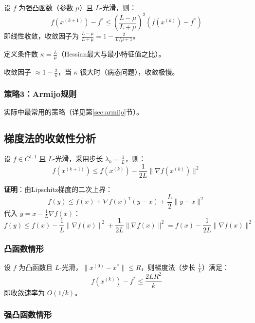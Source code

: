 \begin{theorem}[精确线搜索的收敛率]
设 $f$ 为强凸函数（参数 $\mu$）且 $L$-光滑，则：
\[
f(x^{(k+1)}) - f^* \leq \left(\frac{L - \mu}{L + \mu}\right)^2 (f(x^{(k)}) - f^*)
\]
即线性收敛，收敛因子为 $\frac{L-\mu}{L+\mu} = 1 - \frac{2}{L/\mu + 1}$。
\end{theorem}

\begin{notebox}[条件数的影响]
定义条件数 $\kappa = \frac{L}{\mu}$（Hessian最大与最小特征值之比）。

收敛因子 $\approx 1 - \frac{2}{\kappa}$，当 $\kappa$ 很大时（病态问题），收敛极慢。
\end{notebox}

\subsubsection{策略3：Armijo规则}

实际中最常用的策略（详见第\ref{sec:armijo}节）。

\subsection{梯度法的收敛性分析}\label{sec:gradient-convergence}

\begin{theorem}[梯度下降下降量]
设 $f \in C^{1,1}$ 且 $L$-光滑，采用步长 $\lambda_k = \frac{1}{L}$，则：
\[
f(x^{(k+1)}) \leq f(x^{(k)}) - \frac{1}{2L}\|\nabla f(x^{(k)})\|^2
\]
\end{theorem}

\textbf{证明}：由Lipschitz梯度的二次上界：
\[
f(y) \leq f(x) + \nabla f(x)^T(y-x) + \frac{L}{2}\|y-x\|^2
\]
代入 $y = x - \frac{1}{L}\nabla f(x)$：
\[
f(y) \leq f(x) - \frac{1}{L}\|\nabla f(x)\|^2 + \frac{1}{2L}\|\nabla f(x)\|^2 = f(x) - \frac{1}{2L}\|\nabla f(x)\|^2
\]

\subsubsection{凸函数情形}

\begin{theorem}[凸函数收敛率]
设 $f$ 为凸函数且 $L$-光滑，$\|x^{(0)} - x^*\| \leq R$，则梯度法（步长 $\frac{1}{L}$）满足：
\[
f(x^{(k)}) - f^* \leq \frac{2LR^2}{k}
\]
即收敛速率为 $O(1/k)$。
\end{theorem}

\subsubsection{强凸函数情形}

